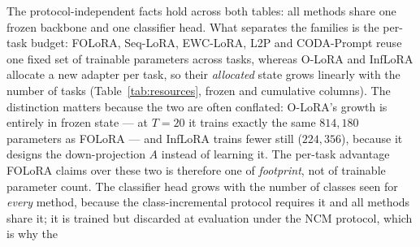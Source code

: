 %
%
The protocol-independent facts hold across both tables: all methods share one frozen
backbone and one classifier head. What separates the families is the per-task budget:
FOLoRA, Seq-LoRA, EWC-LoRA, L2P and CODA-Prompt reuse one fixed set of trainable
parameters across tasks, whereas O-LoRA and InfLoRA allocate a new adapter per task, so
their \emph{allocated} state grows linearly with the number of tasks
(Table~\ref{tab:resources}, frozen and cumulative columns). The distinction matters because
the two are often conflated: O-LoRA's growth is entirely in frozen state --- at $T{=}20$ it
trains exactly the same $814{,}180$ parameters as FOLoRA --- and InfLoRA trains fewer still
($224{,}356$), because it designs the down-projection $A$ instead of learning it. The
per-task advantage FOLoRA claims over these two is therefore one of \emph{footprint}, not of
trainable parameter count. The classifier head grows with the number of classes seen for
\emph{every} method, because the class-incremental protocol requires it and all methods
share it; it is trained but discarded at evaluation under the NCM protocol, which is why the
